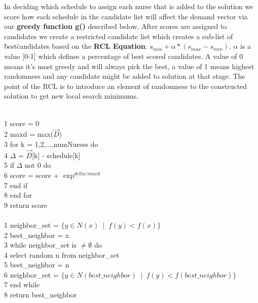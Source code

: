 \documentclass[11pt]{article}
\begin{document}
{In deciding which schedule to assign each nurse that is added to the solution we score how each schedule in the candidate list will
affect the demand vector via our {\bf greedy function g()} described below. After scores are assigned to candidates
we create a restricted candidate list which creates a sub-list of \"best\" candidates based on the {\bf RCL Equation}: 
$s_{min} + \alpha*(s_{max}-s_{min})$. $\alpha$ is a value [0-1] which defines a percentage of best scored candidates. A value
of 0 means it's most greedy and will always pick the best, a value of 1 means highest randomness and any candidate might be added to solution
at that stage. The point of the RCL is to introduce an element of randomness to the constructed solution to get new local search minimums.
 
\pagebreak

\\
1  score = 0\\
2  maxd = max($\vec{D}$)\\
3  for k = 1,2,...,numNurses do\\
4\hspace*{.4cm} $\Delta$ = $\vec{D}$[k] - schedule[k]\\
5\hspace*{.4cm} if $\Delta$ not 0 do\\
6\hspace*{.6cm} score = score + $\exp^{delta/maxd}$\\
7\hspace*{.4cm} end if\\
8  end for\\
9  return score\\

\\
1  neighbor\_set = $\{y \in N(x) \phantom{a}|\phantom{a} f(y) < f(x)\}$\\
2  best\_neighbor = x\\
3  while neighbor\_set is $\ne \emptyset$ do\\
4\hspace*{.4cm} select random n from neighbor\_set\\
5\hspace*{.4cm} best\_neighbor = n\\
6\hspace*{.4cm} neighbor\_set = $\{y \in N(best\_neighbor) \phantom{a}|\phantom{a} f(y) < f(best\_neighbor)\}$\\
7  end while\\
8  return best\_neighbor\\

}
\end{document}
